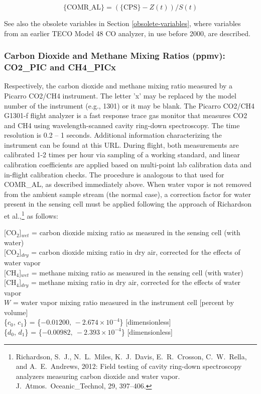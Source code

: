 \documentclass[
  english,
]{book}
\begin{document}
\begin{equation}
\mathrm{\{COMR\_AL\}} = (\mathrm{\{CPS\}}-Z(t))/S(t)
\label{eq:COMRbox}
\end{equation}

See also the obsolete variables in Section \ref{obsolete-variables}, where variables from an earlier TECO Model 48 CO analyzer, in use before 2000, are described.

\hypertarget{co2-pic}{%
\subsubsection*{Carbon Dioxide and Methane Mixing Ratios (ppmv): CO2\_PIC and CH4\_PICx}\label{co2-pic}}

Respectively, the carbon dioxide and methane mixing ratio measured by a Picarro CO2/CH4 instrument. The letter 'x' may be replaced by the model number of the instrument (e.g., 1301) or it may be blank. The Picarro CO2/CH4 G1301-f flight analyzer is a fast response trace gas monitor that measures CO{2} and CH{4} using wavelength-scanned cavity ring-down spectroscopy. The time resolution is 0.2 -- 1 seconds. Additional information characterizing the instrument can be found at this URL. During flight, both measurements are calibrated 1-2 times per hour via sampling of a working standard, and linear calibration coefficients are applied based on multi-point lab calibration data and in-flight calibration checks. The procedure is analogous to that used for COMR\_AL, as described immediately above. When water vapor is not removed from the ambient sample stream (the normal case), a correction factor for water present in the sensing cell must be applied following the approach of Richardson et al.,\footnote{Richardson, S.~J., N.~L.~Miles, K.~J.~Davis, E.~R.~Crosson, C.~W.~Rella, and A.~E.~Andrews, 2012: Field testing of cavity ring-down spectroscopy analyzers measuring carbon dioxide and water vapor. J.~Atmos.~Oceanic\_Technol, 29, 397--406.}
as follows:

{[}CO\(_{2}\){]}\(_{wet}\) = carbon dioxide mixing ratio as measured
in the sensing cell (with water)\\
{[}CO\(_{2}\){]}\(_{dry}\) = carbon dioxide mixing ratio in dry air,
corrected for the effects of water vapor\\
{[}CH\(_{4}\){]}\(_{wet}\) = methane mixing ratio as measured in the
sensing cell (with water)\\
{[}CH\(_{4}\){]}\(_{dry}\) = methane mixing ratio in dry air, corrected
for the effects of water vapor\\
\(W\) = water vapor mixing ratio measured in the instrument cell {[}percent
by volume{]}\\
\{\(c_{0}\), \(c_{1}\)\} = \{\(-0.01200,\,-2.674\times10^{-4}\)\} {[}dimensionless{]}\\
\{\(d_{0}\), \(d_{1}\)\} = \{\(-0.00982,\ -2.393\times10^{-4}\)\} {[}dimensionless{]}
\end{document}
